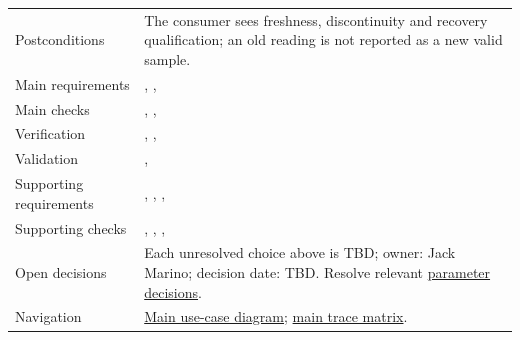 \begin{tabularx}{\linewidth}{L{3.2cm}Y}
Postconditions & The consumer sees freshness, discontinuity and recovery qualification; an old reading is not reported as a new valid sample.\\
Main requirements & , , \\
Main checks & , , \\
Verification & , , \\
Validation & , \\
Supporting requirements & , , , \\
Supporting checks & , , , \\
Open decisions & Each unresolved choice above is TBD; owner: Jack Marino; decision date: TBD. Resolve relevant \hyperref[Table:RequirementParameters]{parameter decisions}.\\
Navigation & \hyperref[Figure:UseCaseDiagram]{Main use-case diagram}; \hyperref[Table:TraceabilityMatrix]{main trace matrix}.\\
\end{tabularx}
\normalsize
